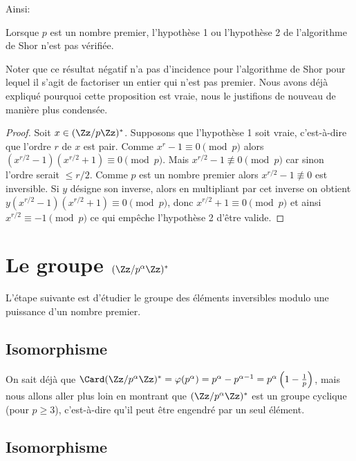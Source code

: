 \documentclass[11pt,class=report,crop=false]{standalone}
\begin{document}
Ainsi:
\begin{proposition}
Lorsque $p$ est un nombre premier, l'hypothèse 1 ou l'hypothèse 2 de l'algorithme de Shor n'est pas vérifiée.
\end{proposition}

Noter que ce résultat négatif n'a pas d'incidence pour l'algorithme de Shor pour lequel il s'agit de factoriser un entier qui n'est pas premier.
Nous avons déjà expliqué pourquoi cette proposition est vraie, nous le justifions de nouveau de manière plus condensée.
\begin{proof}
Soit $x\in (\Zz/p\Zz)^*$. Supposons que l'hypothèse 1 soit vraie, c'est-à-dire que l'ordre $r$ de $x$ est pair. Comme $x^r-1\equiv 0 \pmod{p}$ alors 
$(x^{r/2}-1)(x^{r/2}+1) \equiv 0 \pmod p$. Mais $x^{r/2}-1 \not \equiv 0 \pmod p$ car sinon l'ordre serait $\le r/2$. Comme $p$ est un nombre premier alors $x^{r/2}-1 \not \equiv 0$ est inversible.
Si $y$ désigne son inverse, alors en multipliant par cet inverse on obtient  $y(x^{r/2}-1)(x^{r/2}+1) \equiv 0 \pmod p$, donc $x^{r/2}+1 \equiv 0 \pmod p$
et ainsi $x^{r/2} \equiv -1 \pmod p$ ce qui empêche l'hypothèse 2 d'être valide.
\end{proof}





\section{Le groupe $(\Zz/p^\alpha\Zz)^*$}

L'étape suivante est d'étudier le groupe des éléments inversibles modulo une puissance d'un nombre premier.


\subsection{Isomorphisme}

On sait déjà que $\Card (\Zz/p^\alpha\Zz)^* = \varphi(p^\alpha) = p^\alpha-p^{\alpha-1} = p^\alpha \left( 1-\frac1p\right)$, mais nous allons aller plus loin en montrant que  $(\Zz/p^\alpha\Zz)^*$ est un groupe cyclique (pour $p\ge3$), c'est-à-dire qu'il peut être engendré par un seul élément.

\subsection{Isomorphisme}
\end{document}

